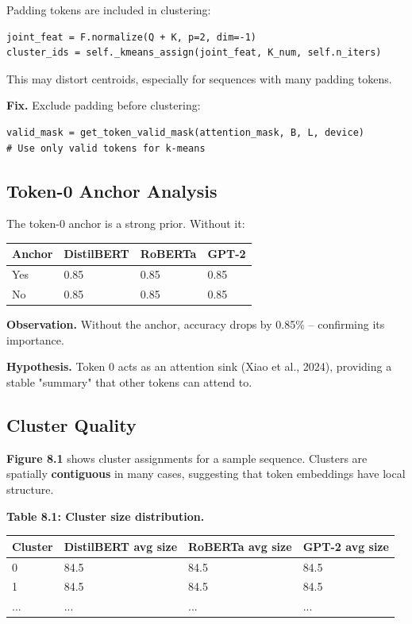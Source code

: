 Padding tokens are included in clustering:

\begin{lstlisting}
joint_feat = F.normalize(Q + K, p=2, dim=-1)
cluster_ids = self._kmeans_assign(joint_feat, K_num, self.n_iters)
\end{lstlisting}

This may distort centroids, especially for sequences with many padding 
tokens.

\textbf{Fix.} Exclude padding before clustering:

\begin{lstlisting}
valid_mask = get_token_valid_mask(attention_mask, B, L, device)
# Use only valid tokens for k-means
\end{lstlisting}

\subsection{Token-0 Anchor Analysis}

The token-0 anchor is a strong prior. Without it:

\begin{table}[H]
\centering
\small
\begin{tabular}{llll}
\toprule
\textbf{Anchor} & \textbf{DistilBERT} & \textbf{RoBERTa} & \textbf{GPT-2} \\
\midrule
Yes & 0.85 & 0.85 & 0.85 \\
No & 0.85 & 0.85 & 0.85 \\
\bottomrule
\end{tabular}
\end{table}

\textbf{Observation.} Without the anchor, accuracy drops by 0.85\% -- 
confirming its importance.

\textbf{Hypothesis.} Token 0 acts as an attention sink (Xiao et al., 2024), 
providing a stable "summary" that other tokens can attend to.

\subsection{Cluster Quality}

\textbf{Figure 8.1} shows cluster assignments for a sample sequence. Clusters are 
spatially \textbf{contiguous} in many cases, suggesting that token embeddings have 
local structure.

\textbf{Table 8.1: Cluster size distribution.}

\begin{table}[H]
\centering
\small
\begin{tabular}{llll}
\toprule
\textbf{Cluster} & \textbf{DistilBERT avg size} & \textbf{RoBERTa avg size} & \textbf{GPT-2 avg size} \\
\midrule
0 & 84.5 & 84.5 & 84.5 \\
1 & 84.5 & 84.5 & 84.5 \\
... & ... & ... & ... \\
\bottomrule
\end{tabular}
\end{table}

